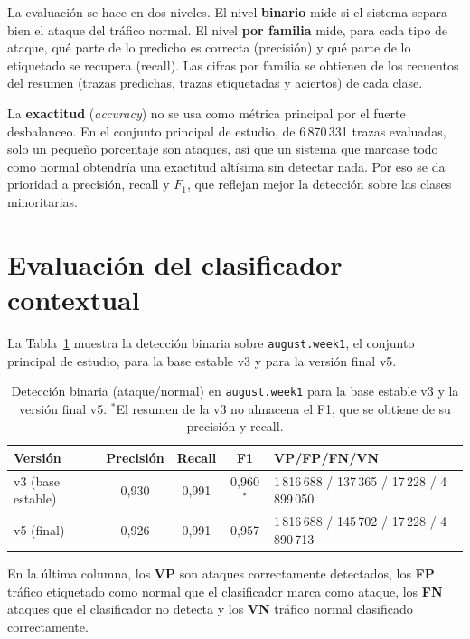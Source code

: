 La evaluación se hace en dos niveles. El nivel \textbf{binario} mide si el sistema separa bien el ataque del tráfico normal. El nivel \textbf{por familia} mide, para cada tipo de ataque, qué parte de lo predicho es correcta (precisión) y qué parte de lo etiquetado se recupera (recall). Las cifras por familia se obtienen de los recuentos del resumen (trazas predichas, trazas etiquetadas y aciertos) de cada clase.

La \textbf{exactitud} (\emph{accuracy}) no se usa como métrica principal por el fuerte desbalanceo. En el conjunto principal de estudio, de 6\,870\,331 trazas evaluadas, solo un pequeño porcentaje son ataques, así que un sistema que marcase todo como normal obtendría una exactitud altísima sin detectar nada. Por eso se da prioridad a precisión, recall y $F_1$, que reflejan mejor la detección sobre las clases minoritarias.

\section{Evaluación del clasificador contextual}
\label{sec:exp_v5}

La Tabla~\ref{tab:exp_binaria} muestra la detección binaria sobre \texttt{august.week1}, el conjunto principal de estudio, para la base estable v3 y para la versión final v5.

\begin{table}[ht]
\centering
\small
\begin{tabular}{|l|c|c|c|l|}
\hline
\textbf{Versión} & \textbf{Precisión} & \textbf{Recall} & \textbf{F1} & \textbf{VP/FP/FN/VN} \\
\hline
v3 (base estable) & 0,930 & 0,991 & 0,960$^{*}$ & 1\,816\,688 / 137\,365 / 17\,228 / 4\,899\,050 \\
\hline
v5 (final) & 0,926 & 0,991 & 0,957 & 1\,816\,688 / 145\,702 / 17\,228 / 4\,890\,713 \\
\hline
\end{tabular}
\caption{Detección binaria (ataque/normal) en \texttt{august.week1} para la base estable v3 y la versión final v5. $^{*}$El resumen de la v3 no almacena el F1, que se obtiene de su precisión y recall.}
\label{tab:exp_binaria}
\end{table}

En la última columna, los \textbf{VP} son ataques correctamente detectados, los \textbf{FP} tráfico etiquetado como normal que el clasificador marca como ataque, los \textbf{FN} ataques que el clasificador no detecta y los \textbf{VN} tráfico normal clasificado correctamente.

